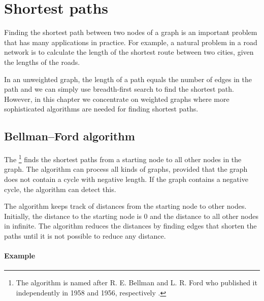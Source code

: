 \chapter{Shortest paths}


Finding the shortest path between two nodes
of a graph
is an important problem that has many
applications in practice.
For example, a natural problem in a road network
is to calculate the length of the shortest route
between two cities, given the lengths of the roads.

In an unweighted graph, the length of a path equals
the number of edges in the path and we can
simply use breadth-first search to find
the shortest path.
However, in this chapter we concentrate on
weighted graphs
where more sophisticated algorithms
are needed
for finding shortest paths.

\section{Bellman–Ford algorithm}


The \footnote{The algorithm is named after
R. E. Bellman and L. R. Ford who published it independently
in 1958 and 1956, respectively \cite{bel58,for56a}.} finds the
shortest paths from a starting node to all
other nodes in the graph.
The algorithm can process all kinds of graphs,
provided that the graph does not contain a
cycle with negative length.
If the graph contains a negative cycle,
the algorithm can detect this.

The algorithm keeps track of distances
from the starting node to other nodes.
Initially, the distance to the starting node is 0
and the distance to all other nodes in infinite.
The algorithm reduces the distances by finding
edges that shorten the paths until it is not
possible to reduce any distance.

\subsubsection{Example}


